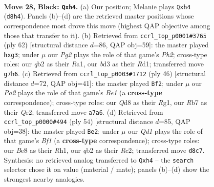 \documentclass[11pt]{article}
\begin{document}
\clearpage

\begin{figure}[p]\centering
\begin{subfigure}{0.46\textwidth}\centering
\resizebox{\linewidth}{!}{%
\newchessgame
\chessboard[
  setfen={r2qb1k1/pr3pp1/7P/p2pN3/4n2P/PP1B4/1Q3P2/R3R1K1 b - - 0 28},
  showmover=false,
  pgfstyle=straightmove, color=movearrow, markmove={d8-h4}
]}
\caption{}
\end{subfigure}\hfill
\begin{subfigure}{0.46\textwidth}\centering
\resizebox{\linewidth}{!}{%
\newchessgame
\chessboard[
  setfen={3r1r1k/1p1q3p/p4n2/P1p5/2B5/1P3Pp1/2Qb3P/R2R2NK w - - 0 32},
  showmover=false,
  pgfstyle=straightmove, color=movearrow, markmove={h2-g3}
]}
\caption{}
\end{subfigure}
\\[4pt]
\begin{subfigure}{0.46\textwidth}\centering
\resizebox{\linewidth}{!}{%
\newchessgame
\chessboard[
  setfen={1q2k2r/1r4p1/3ppb1p/p1n5/5PP1/1N6/1PP1Q2P/1K1RB1R1 w k - 2 24},
  showmover=false,
  pgfstyle=straightmove, color=movearrow, markmove={e1-f2}
]}
\caption{}
\end{subfigure}\hfill
\begin{subfigure}{0.46\textwidth}\centering
\resizebox{\linewidth}{!}{%
\newchessgame
\chessboard[
  setfen={1rb2r1k/5qp1/5n1p/p1Np4/3Qp1P1/7P/PPR2P2/1K3B1R w - - 0 28},
  showmover=false,
  pgfstyle=straightmove, color=movearrow, markmove={f1-e2}
]}
\caption{}
\end{subfigure}
\caption{\textbf{Move 28, Black: \texttt{Qxh4}.} (a) Our position; Melanie plays \texttt{Qxh4} (\texttt{d8h4}). Panels (b)--(d) are the retrieved master positions whose correspondence most drove this move (highest QAP objective among those that transfer to it). (b) Retrieved from \texttt{ccrl\_top\_p0001\#3765} (ply 62) [structural distance $d$=86, QAP obj=59]: the master played \texttt{hxg3}; under $\mu$ our \emph{Pg2} plays the role of that game's \emph{Ph2}; cross-type roles: our \emph{q}b2 as their \emph{R}a1, our \emph{b}d3 as their \emph{R}d1; transferred move \texttt{g7h6}. (c) Retrieved from \texttt{ccrl\_top\_p0003\#1712} (ply 46) [structural distance $d$=72, QAP obj=41]: the master played \texttt{Bf2}; under $\mu$ our \emph{Pa2} plays the role of that game's \emph{Be1} (a \textbf{cross-type} correspondence); cross-type roles: our \emph{Q}d8 as their \emph{R}g1, our \emph{R}b7 as their \emph{Q}e2; transferred move \texttt{a7a6}. (d) Retrieved from \texttt{ccrl\_top\_p0000\#494} (ply 54) [structural distance $d$=85, QAP obj=38]: the master played \texttt{Be2}; under $\mu$ our \emph{Qd1} plays the role of that game's \emph{Bf1} (a \textbf{cross-type} correspondence); cross-type roles: our \emph{B}e8 as their \emph{R}h1, our \emph{q}b2 as their \emph{R}c2; transferred move \texttt{d8c7}. Synthesis: no retrieved analog transferred to \texttt{Qxh4} -- the \texttt{search} selector chose it on value (material / mate); panels (b)--(d) show the strongest nearby analogies.}
\label{fig:thought-m55}
\end{figure}
\end{document}
